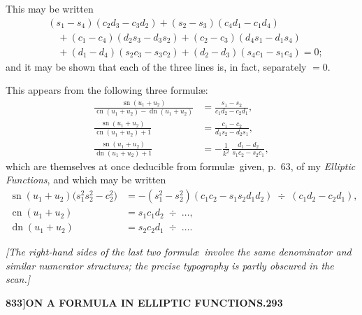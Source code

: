 \documentclass[11pt]{article}
\begin{document}
\medskip

This may be written
\begin{align*}
&(s_{1}-s_{4})(c_{2}d_{3}-c_{3}d_{2}) + (s_{2}-s_{3})(c_{4}d_{1}-c_{1}d_{4}) \\
&\quad{}+ (c_{1}-c_{4})(d_{2}s_{3}-d_{3}s_{2}) + (c_{2}-c_{3})(d_{4}s_{1}-d_{1}s_{4}) \\
&\quad{}+ (d_{1}-d_{4})(s_{2}c_{3}-s_{3}c_{2}) + (d_{2}-d_{3})(s_{4}c_{1}-s_{1}c_{4}) = 0;
\end{align*}
and it may be shown that each of the three lines is, in fact, separately $= 0$.

\medskip

This appears from the following three formul\ae:
\begin{align*}
\frac{\operatorname{sn}(u_{1} + u_{2})}{\operatorname{cn}(u_{1} + u_{2}) - \operatorname{dn}(u_{1} + u_{2})} &= \frac{s_{1} - s_{2}}{c_{1}d_{2} - c_{2}d_{1}}, \\[4pt]
\frac{\operatorname{sn}(u_{1} + u_{2})}{\operatorname{cn}(u_{1} + u_{2}) + 1} &= \frac{c_{1} - c_{2}}{d_{1}s_{2} - d_{2}s_{1}}, \\[4pt]
\frac{\operatorname{sn}(u_{1} + u_{2})}{\operatorname{dn}(u_{1} + u_{2}) + 1} &= -\frac{1}{k^{2}}\,\frac{d_{1} - d_{2}}{s_{1}c_{2} - s_{2}c_{1}},
\end{align*}
which are themselves at once deducible from formul\ae\ given, p.\ 63, of my \textit{Elliptic Functions}, and which may be written
\begin{align*}
\operatorname{sn}(u_{1} + u_{2})\bigl(s_{1}^{2}s_{2}^{2} - c_{2}^{2}\bigr) &= -(s_{1}^{2} - s_{2}^{2})(c_{1}c_{2} - s_{1}s_{2}d_{1}d_{2})\;\div\;(c_{1}d_{2} - c_{2}d_{1}), \\
\operatorname{cn}(u_{1} + u_{2}) &= s_{1}c_{1}d_{2}\;\div\;\ldots, \\
\operatorname{dn}(u_{1} + u_{2}) &= s_{2}c_{2}d_{1}\;\div\;\ldots.
\end{align*}

\medskip

\noindent\textit{[The right-hand sides of the last two formul\ae\ involve the same denominator and similar numerator structures; the precise typography is partly obscured in the scan.]}

\newpage

\noindent\textbf{833]}\hfill\textbf{ON A FORMULA IN ELLIPTIC FUNCTIONS.}\hfill\textbf{293}

\bigskip
\end{document}
